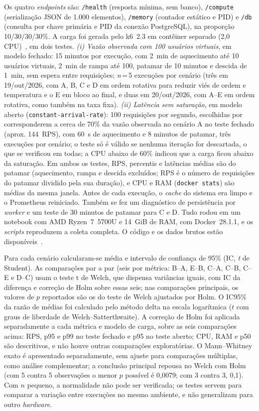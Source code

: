 Os quatro \textit{endpoints} são: \texttt{/health} (resposta mínima, sem banco), \texttt{/compute} (serialização JSON de 1.000 elementos), \texttt{/memory} (contador estático e PID) e \texttt{/db} (consulta por chave primária e PID da conexão PostgreSQL), na proporção 10/30/30/30\%. A carga foi gerada pelo k6~2.3 em contêiner separado (2,0 CPU)~\cite{grafana2024}, em dois testes. \emph{(i) Vazão observada com 100 usuários virtuais}, em modelo fechado: 15 minutos por execução, com 2~min de aquecimento até 10 usuários virtuais, 2~min de rampa até 100, patamar de 10 minutos e descida de 1~min, sem espera entre requisições; \emph{n}\,=\,5 execuções por cenário (três em 19/out/2026, com A, B, C e D em ordem rotativa para reduzir viés de ordem e temperatura e o E em bloco ao final, e duas em 20/out/2026, com A--E em ordem rotativa, como também na taxa fixa). \emph{(ii) Latência sem saturação}, em modelo aberto (\texttt{constant-arrival-rate}): 100 requisições por segundo, escolhidas por corresponderem a cerca de 70\% da vazão observada no cenário A no teste fechado (aprox. 144~RPS), com 60~s de aquecimento e 8 minutos de patamar, três execuções por cenário; o teste só é válido se nenhuma iteração for descartada, o que se verificou em todas; a CPU abaixo de 60\% indicou que a carga ficou abaixo da saturação. Em ambos os testes, RPS, percentis e latências médias são do patamar (aquecimento, rampa e descida excluídos; RPS é o número de requisições do patamar dividido pela sua duração), e CPU e RAM (\texttt{docker stats}) são médias da mesma janela. Antes de cada execução, o \textit{cache} do sistema era limpo e o Prometheus reiniciado. Também se fez um diagnóstico de persistência por \textit{worker} e um teste de 30 minutos de patamar para C e D. Tudo rodou em um notebook com AMD Ryzen~7~5700U e 14~GiB de RAM, com Docker~28.1.1, e os \textit{scripts} reproduzem a coleta completa. O código e os dados brutos estão disponíveis~\cite{cotb_benchmark_2026}.

Para cada cenário calcularam-se média e intervalo de confiança de 95\% (IC, \textit{t} de Student). As comparações par a par (seis por métrica: B--A, E--B, C--A, C--B, C--E e D--C) usam o teste t de Welch, que dispensa variâncias iguais, com IC da diferença e correção de Holm sobre essas seis; nas comparações principais, os valores de $p$ reportados são os do teste de Welch ajustados por Holm. O IC95\% da razão de médias foi calculado pelo método delta na escala logarítmica ($t$ com graus de liberdade de Welch--Satterthwaite). A correção de Holm foi aplicada separadamente a cada métrica e modelo de carga, sobre as seis comparações acima: RPS, p95 e p99 no teste fechado e p95 no teste aberto; CPU, RAM e p50 são descritivos, e não houve outras comparações exploratórias. O Mann--Whitney exato é apresentado separadamente, sem ajuste para comparações múltiplas, como análise complementar; a conclusão principal repousa no Welch com Holm (com 5 contra 5 observações o menor $p$ possível é 0,0079; com 3 contra 3, 0,1). Com $n$ pequeno, a normalidade não pode ser verificada; os testes servem para comparar a variação entre execuções no mesmo ambiente, e não generalizam para outro \textit{hardware}.

